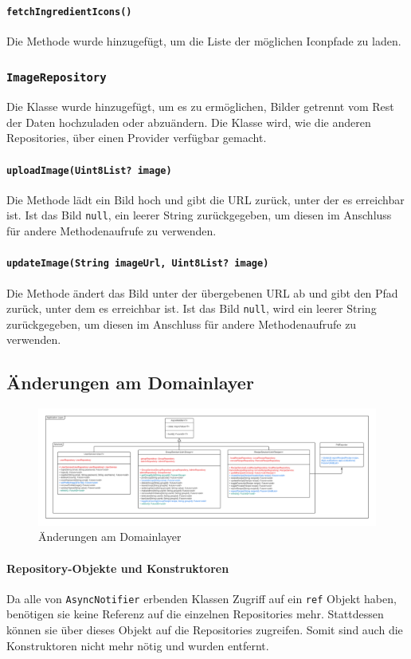 \documentclass{implementierungsheft}
\begin{document}
\paragraph{\texttt{fetchIngredientIcons()}} Die Methode wurde hinzugefügt, um die Liste der möglichen Iconpfade zu laden.
\subsubsection{\texttt{ImageRepository}}
Die Klasse wurde hinzugefügt, um es zu ermöglichen, Bilder getrennt vom Rest der Daten hochzuladen oder abzuändern. Die Klasse wird, wie die anderen Repositories, über einen Provider verfügbar gemacht.
\paragraph{\texttt{uploadImage(Uint8List? image)}} Die Methode lädt ein Bild hoch und gibt die URL zurück, unter der es erreichbar ist. Ist das Bild \texttt{null}, ein leerer String zurückgegeben, um diesen im Anschluss für andere Methodenaufrufe zu verwenden.
\paragraph{\texttt{updateImage(String imageUrl, Uint8List? image)}} Die Methode ändert das Bild unter der übergebenen URL ab und gibt den Pfad zurück, unter dem es erreichbar ist. Ist das Bild \texttt{null}, wird ein leerer String zurückgegeben, um diesen im Anschluss für andere Methodenaufrufe zu verwenden.
\newpage
\subsection{Änderungen am Domainlayer}
\begin{figure}[htp]
    \centering
    \includegraphics[width=\textwidth]{images/uml/domainLayer.pdf}
    \caption{Änderungen am Domainlayer}
    \label{fig:domainLayer}
\end{figure}
\paragraph{Repository-Objekte und Konstruktoren}
Da alle von \texttt{AsyncNotifier} erbenden Klassen Zugriff auf ein \texttt{ref} Objekt haben, benötigen sie keine Referenz auf die einzelnen Repositories mehr. Stattdessen können sie über dieses Objekt auf die Repositories zugreifen. Somit sind auch die Konstruktoren nicht mehr nötig und wurden entfernt.
\end{document}
